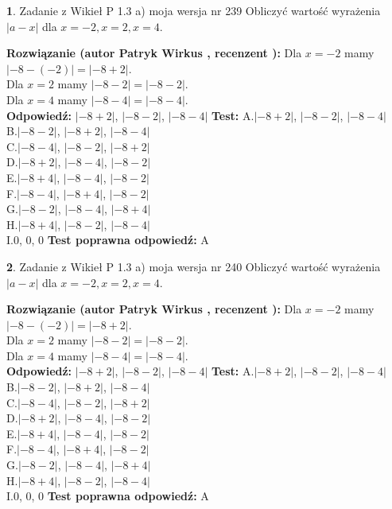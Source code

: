 \documentclass[12pt, a4paper]{article}
\theoremstyle{definition} %
\newtheorem{zad}{}
\newcommand{\zadStart}[1]{\begin{zad}#1\newline}
\newcommand{\zadStop}{\end{zad}}
\newcommand{\rozwStart}[2]{\noindent \textbf{Rozwiązanie (autor #1 , recenzent #2): }\newline}
\newcommand{\rozwStop}{\newline}
\newcommand{\odpStart}{\noindent \textbf{Odpowiedź:}\newline}
\newcommand{\odpStop}{\newline}
\newcommand{\testStart}{\noindent \textbf{Test:}\newline}
\newcommand{\testStop}{\newline}
\newcommand{\kluczStart}{\noindent \textbf{Test poprawna odpowiedź:}\newline}
\newcommand{\kluczStop}{\newline}
\begin{document}
\zadStart{Zadanie z Wikieł P 1.3 a) moja wersja nr 239}
Obliczyć wartość wyrażenia $|a - x|$ dla $x=-2,x=2,x=4$.
\zadStop
\rozwStart{Patryk Wirkus}{}
Dla $x = -2$ mamy $|-8 - (-2)| = |-8 + 2|$.\\
Dla $x = 2$ mamy $|-8 - 2| = |-8 - 2|$.\\
Dla $x = 4$ mamy $|-8 - 4| = |-8 - 4|$.\\
\rozwStop
\odpStart
$|-8 + 2|$, $|-8 - 2|$, $|-8 - 4|$
\odpStop
\testStart
A.$|-8 + 2|$, $|-8 - 2|$, $|-8 - 4|$\\
B.$|-8 - 2|$, $|-8 + 2|$, $|-8 - 4|$\\
C.$|-8 - 4|$, $|-8 - 2|$, $|-8 + 2|$\\
D.$|-8 + 2|$, $|-8 - 4|$, $|-8 - 2|$\\
E.$|-8 + 4|$, $|-8 - 4|$, $|-8 - 2|$\\
F.$|-8 - 4|$, $|-8 + 4|$, $|-8 - 2|$\\
G.$|-8 - 2|$, $|-8 - 4|$, $|-8 + 4|$\\
H.$|-8 + 4|$, $|-8 - 2|$, $|-8 - 4|$\\
I.$0$, $0$, $0$
\testStop
\kluczStart
A
\kluczStop



\zadStart{Zadanie z Wikieł P 1.3 a) moja wersja nr 240}
Obliczyć wartość wyrażenia $|a - x|$ dla $x=-2,x=2,x=4$.
\zadStop
\rozwStart{Patryk Wirkus}{}
Dla $x = -2$ mamy $|-8 - (-2)| = |-8 + 2|$.\\
Dla $x = 2$ mamy $|-8 - 2| = |-8 - 2|$.\\
Dla $x = 4$ mamy $|-8 - 4| = |-8 - 4|$.\\
\rozwStop
\odpStart
$|-8 + 2|$, $|-8 - 2|$, $|-8 - 4|$
\odpStop
\testStart
A.$|-8 + 2|$, $|-8 - 2|$, $|-8 - 4|$\\
B.$|-8 - 2|$, $|-8 + 2|$, $|-8 - 4|$\\
C.$|-8 - 4|$, $|-8 - 2|$, $|-8 + 2|$\\
D.$|-8 + 2|$, $|-8 - 4|$, $|-8 - 2|$\\
E.$|-8 + 4|$, $|-8 - 4|$, $|-8 - 2|$\\
F.$|-8 - 4|$, $|-8 + 4|$, $|-8 - 2|$\\
G.$|-8 - 2|$, $|-8 - 4|$, $|-8 + 4|$\\
H.$|-8 + 4|$, $|-8 - 2|$, $|-8 - 4|$\\
I.$0$, $0$, $0$
\testStop
\kluczStart
A
\kluczStop
\end{document}
